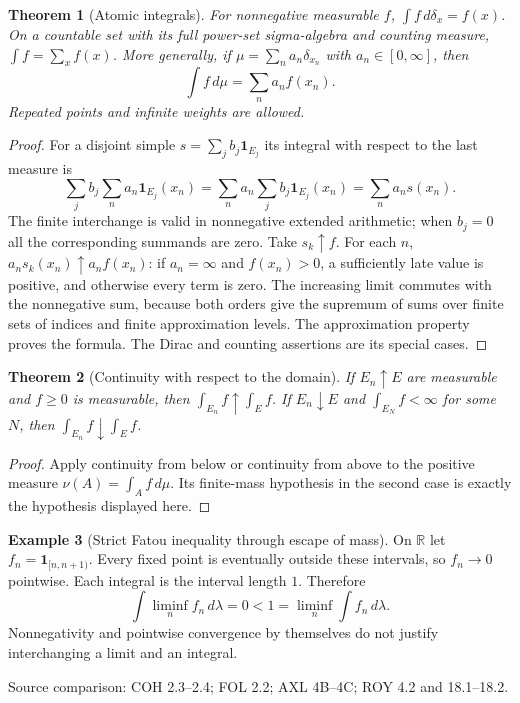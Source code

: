 \documentclass[11pt,oneside,openany]{book}
\newtheorem{theorem}{Theorem}[chapter]
\theoremstyle{definition}
\newtheorem{example}[theorem]{Example}
\theoremstyle{remark}
\newcommand{\R}{\mathbb R}\newcommand{\C}{\mathbb C}
\newcommand{\one}{\mathbf1}\newcommand{\ind}[1]{\mathbf1_{#1}}
\newcommand{\Eplus}{[0,\infty]}
\newcommand{\family}[1]{}
\newcommand{\source}[1]{\par\begingroup\small\sffamily\color{black!65}Source comparison: #1\par\endgroup}
\begin{document}
\begin{theorem}[Atomic integrals]
\family{D11.05.atomic_integrals}\label{d11:05:atomic-integrals}
For nonnegative measurable $f$, $\int f\,d\delta_x=f(x)$.
On a countable set with its full power-set sigma-algebra and counting
measure, $\int f=\sum_x f(x)$. More generally, if
$\mu=\sum_n a_n\delta_{x_n}$ with $a_n\in\Eplus$, then
\[
 \int f\,d\mu=\sum_n a_nf(x_n).
\]
Repeated points and infinite weights are allowed.
\end{theorem}
\begin{proof}
For a disjoint simple $s=\sum_jb_j\one_{E_j}$ its integral with respect
to the last measure is
\[
 \sum_j b_j\sum_n a_n\one_{E_j}(x_n)
 =\sum_n a_n\sum_j b_j\one_{E_j}(x_n)=\sum_n a_ns(x_n).
\]
The finite interchange is valid in nonnegative extended arithmetic; when
$b_j=0$ all the corresponding summands are zero. Take $s_k\uparrow f$.
For each $n$, $a_ns_k(x_n)\uparrow a_nf(x_n)$: if $a_n=\infty$ and
$f(x_n)>0$, a sufficiently late value is positive, and otherwise every
term is zero. The increasing limit commutes with the nonnegative sum,
because both orders give the supremum of sums over finite sets of indices
and finite approximation levels. The approximation property proves the
formula. The Dirac and counting assertions are its special cases.
\end{proof}

\begin{theorem}[Continuity with respect to the domain]
\family{D11.05.continuity_domains}\label{d11:05:continuity-domains}
If $E_n\uparrow E$ are measurable and $f\geq0$ is measurable, then
$\int_{E_n}f\uparrow\int_Ef$. If $E_n\downarrow E$ and
$\int_{E_N}f<\infty$ for some $N$, then $\int_{E_n}f\downarrow\int_Ef$.
\end{theorem}
\begin{proof}
Apply continuity from below or continuity from above to the positive
measure $\nu(A)=\int_Af\,d\mu$. Its finite-mass hypothesis in the second
case is exactly the hypothesis displayed here.
\end{proof}

\begin{example}[Strict Fatou inequality through escape of mass]
\family{D11.05.fatou_strict_mass_escape}\label{d11:05:fatou-strict-mass-escape}
On $\R$ let $f_n=\one_{[n,n+1)}$. Every fixed point is eventually outside
these intervals, so $f_n\to0$ pointwise. Each integral is the interval
length $1$. Therefore
\[
 \int\liminf_n f_n\,d\lambda=0<1=\liminf_n\int f_n\,d\lambda.
\]
Nonnegativity and pointwise convergence by themselves do not justify
interchanging a limit and an integral.
\end{example}
\source{COH 2.3--2.4; FOL 2.2; AXL 4B--4C; ROY 4.2 and 18.1--18.2.}
\end{document}
